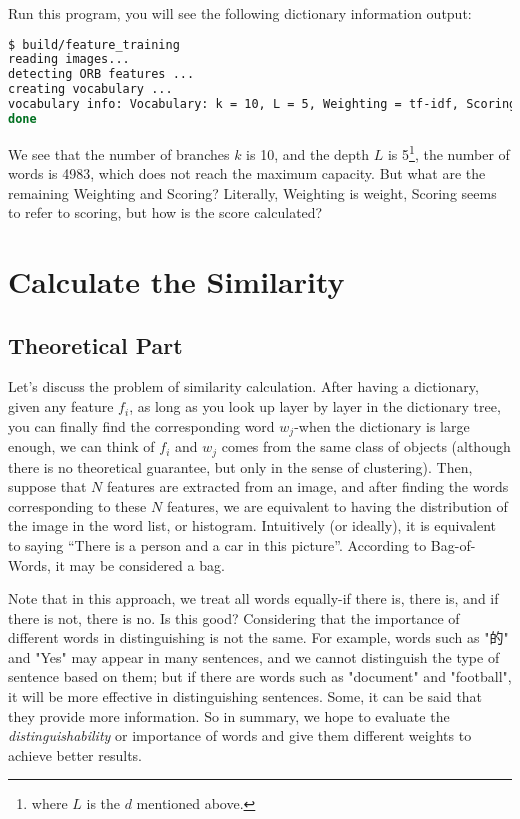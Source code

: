Run this program, you will see the following dictionary information output:
\begin{lstlisting}[language=sh,caption=Terminal output:]
$ build/feature_training
reading images...
detecting ORB features ...
creating vocabulary ...
vocabulary info: Vocabulary: k = 10, L = 5, Weighting = tf-idf, Scoring = L1-norm, Number of words = 4983
done
\end{lstlisting}
We see that the number of branches $k$ is 10, and the depth $L$ is 5\footnote{where $L$ is the $d$ mentioned above. }, the number of words is 4983, which does not reach the maximum capacity. But what are the remaining Weighting and Scoring? Literally, Weighting is weight, Scoring seems to refer to scoring, but how is the score calculated?


\section{Calculate the Similarity}
\subsection{Theoretical Part}
Let's discuss the problem of similarity calculation. After having a dictionary, given any feature $f_i$, as long as you look up layer by layer in the dictionary tree, you can finally find the corresponding word $w_j$-when the dictionary is large enough, we can think of $f_i$ and $ w_j$ comes from the same class of objects (although there is no theoretical guarantee, but only in the sense of clustering). Then, suppose that $N$ features are extracted from an image, and after finding the words corresponding to these $N$ features, we are equivalent to having the distribution of the image in the word list, or histogram. Intuitively (or ideally), it is equivalent to saying ``There is a person and a car in this picture''. According to Bag-of-Words, it may be considered a bag.

Note that in this approach, we treat all words equally-if there is, there is, and if there is not, there is no. Is this good? Considering that the importance of different words in distinguishing is not the same. For example, words such as "的" and "Yes" may appear in many sentences, and we cannot distinguish the type of sentence based on them; but if there are words such as "document" and "football", it will be more effective in distinguishing sentences. Some, it can be said that they provide more information. So in summary, we hope to evaluate the \textit{distinguishability} or importance of words and give them different weights to achieve better results.


